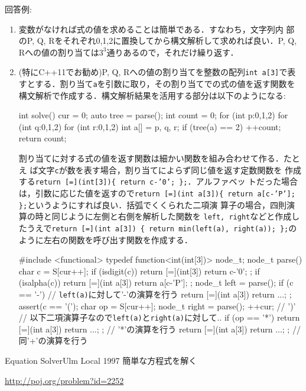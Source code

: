 回答例:
\begin{enumerate}
\item 変数がなければ式の値を求めることは簡単である．すなわち，文字列内
  部のP, Q, Rをそれぞれ0,1,2に置換してから構文解析して求めれば良い．P,
  Q, Rへの値の割り当ては$3^3$通りあるので，それだけ繰り返す．
\item (特にC++11でお勧め)P, Q, Rへの値の割り当てを整数の配列\texttt{int a[3]}で表すとする．割り当て\texttt{a}を引数に取り，その割り当てでの式の値を返す関数を構文解析で作成する．構文解析結果を活用する部分は以下のようになる:
  \begin{c11box}
int solve() {
    cur = 0;
    auto tree = parse();
    int count = 0;
    for (int p:{0,1,2})
	for (int q:{0,1,2})
	    for (int r:{0,1,2}) {
		int a[] = {p, q, r};
		if (tree(a) == 2) ++count;
	    }
    return count;
}    
  \end{c11box}
割り当てに対する式の値を返す関数は細かい関数を組み合わせて作る．たとえ
ば文字\texttt{c}が数を表す場合，割り当てによらず同じ値を返す定数関数を
作成する\texttt{return [=](int[3])\{ return c-'0'; \};}．アルファベッ
トだった場合は，引数に応じた値を返すので\texttt{return [=](int a[3])\{
  return a[c-'P']; \};}というようにすれば良い．括弧でくくられた二項演
算子の場合，四則演算の時と同じように左側と右側を解析した関数を
\texttt{left, right}などと作成したうえで\texttt{return [=](int a[3]) \{ return min(left(a), right(a)); \};}のように左右の関数を呼び出す関数を作成する．
\begin{c11box}
#include <functional>
typedef function<int(int[3])> node_t;
node_t parse() {
    char c = S[cur++];
    if (isdigit(c))
	return [=](int[3]){ return c-'0'; };
    if (isalpha(c))
	return [=](int a[3]){ return a[c-'P']; };
    node_t left = parse();
    if (c == '-')  // \texttt{left(a)}に対して'-'の演算を行う
	return [=](int a[3]) { return ...; };
    assert(c == '(');
    char op = S[cur++];
    node_t right = parse();
    ++cur; // ')'
    // 以下二項演算子なので\texttt{left(a)}と\texttt{right(a)}に対して..
    if (op == '*')
	return [=](int a[3]) { return ...; }; // '*'の演算を行う
    return [=](int a[3]) { return ...; }; // 同'+'の演算を行う
}  
\end{c11box}
\end{enumerate}

\begin{pbox}{Equation Solver}{Ulm Local 1997}
簡単な方程式を解く

\url{http://poj.org/problem?id=2252}
\end{pbox}

